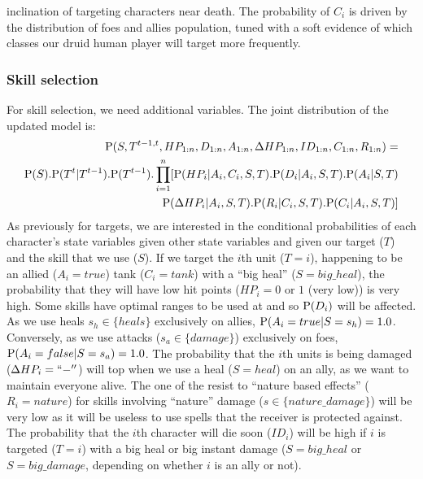 inclination of targeting characters near death. The probability of $C_i$ is driven by the distribution of foes and allies population, tuned with a soft evidence of which classes our druid human player will target more frequently. %


\subsubsection{Skill selection}
For skill selection, we need additional variables. The joint distribution of the updated model is: 
\begin{eqnarray}
\mathrm{P}(S, T^{t-1,t}, HP_{1:n}, D_{1:n}, A_{1:n}, \Delta HP_{1:n}, ID_{1:n}, C_{1:n}, R_{1:n}) = \\
\mathrm{P}(S).\mathrm{P}(T^t|T^{t-1}).\mathrm{P}(T^{t-1}).\prod_{i=1}^n [ \mathrm{P}(HP_i | A_i, C_i, S, T).\mathrm{P}(D_i | A_i, S, T).\mathrm{P}(A_i | S, T) \\
        \mathrm{P}(\Delta HP_i | A_i, S, T). \mathrm{P}(R_i | C_i, S, T). \mathrm{P}(C_i | A_i, S, T) ]
\end{eqnarray}
As previously for targets, we are interested in the conditional probabilities of each character's state variables given other state variables and given our target ($T$) and the skill that we use ($S$). If we target the $i$th unit ($T=i$), happening to be an allied ($A_i=true$) tank ($C_i=tank$) with a ``big heal'' ($S=big\_heal$), the probability that they will have low hit points ($HP_i=0$ or $1$ (very low)) is very high. Some skills have optimal ranges to be used at and so $\mathrm{P}(D_i)$ will be affected. As we use heals $s_h\in \{heals\}$ exclusively on allies, $\mathrm{P}(A_i=true|S=s_h) =1.0$. Conversely, as we use attacks ($s_a\in \{damage\}$) exclusively on foes, $\mathrm{P}(A_i=false|S=s_a)=1.0$. The probability that the $i$th units is being damaged ($\Delta HP_i=``-''$) will top when we use a heal ($S=heal$) on an ally, as we want to maintain everyone alive. The one of the resist to ``nature based effects'' ($R_i=nature$) for skills involving ``nature'' damage ($s \in \{nature\_damage\}$) will be very low as it will be useless to use spells that the receiver is protected against. The probability that the $i$th character will die soon ($ID_i$) will be high if $i$ is targeted ($T=i$) with a big heal or big instant damage ($S=big\_heal$ or $S=big\_damage$, depending on whether $i$ is an ally or not). %


